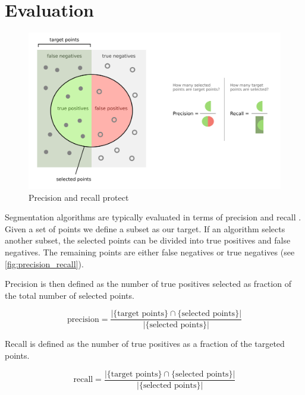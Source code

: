\section{Evaluation}

\begin{figure}[ht]
  \centering
  \includegraphics[width=1\linewidth]{images/precision_recall.png}
  \caption[Precision and recall]{Precision and recall protect\footnotemark[\value{footnote}] } 
  \label{fig:precision_recall}
\end{figure}

Segmentation algorithms are typically evaluated in terms of precision and recall \cite{Ponce2012}. Given a set of points we define a subset as our target. If an algorithm selects another subset, the selected points can be divided into true positives and false negatives. The remaining points are either false negatives or true negatives (see \autoref{fig:precision_recall}).

Precision is then defined as the number of true positives selected as fraction of the total number of selected points.

\begin{equation} \label{eq:precision}
	\text{precision}=\frac{|\{\text{target points}\}\cap\{\text{selected points}\}|}{|\{\text{selected points}\}|}
\end{equation}

Recall is defined as the number of true positives as a fraction of the targeted points.

\begin{equation} \label{eq:recall}
	\text{recall}=\frac{|\{\text{target points}\}\cap\{\text{selected points}\}|}{|\{\text{selected points}\}|}
\end{equation}

